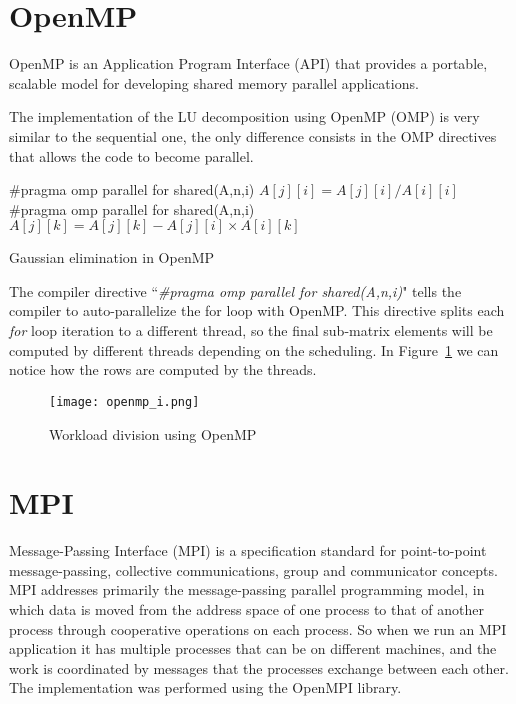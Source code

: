 \section{OpenMP}
OpenMP is an Application Program Interface (API) that provides a portable, scalable model for developing shared memory parallel applications.

The implementation of the LU decomposition using OpenMP (OMP) is very similar to the sequential one, the only difference consists in the OMP directives that allows the code to become parallel.

\begin{algorithm}
\begin{algorithmic}
	\State \#pragma omp parallel for shared(A,n,i)
		\State $A[j][i] = A[j][i] / A[i][i]$ 
	\EndFor
	\State \#pragma omp parallel for shared(A,n,i)
			\State $A[j][k] = A[j][k] - A[j][i] \times A[i][k]$ 
		\EndFor	
	\EndFor
\EndFor
\end{algorithmic}
\caption{Gaussian elimination in OpenMP}
\label{alg:omp_code}
\end{algorithm}

The compiler directive ``\textit{\#pragma omp parallel for shared(A,n,i)}" tells the compiler to auto-parallelize the for loop with OpenMP. This directive splits each \textit{for} loop iteration to a different thread, so the final sub-matrix elements will be computed by different threads depending on the scheduling. In Figure~\ref{img:omp_workload}  we can notice how the rows are computed by the threads.


\begin{figure}[H]
\centering
\texttt{[image: openmp\_i.png]}
\caption{Workload division using OpenMP}
\label{img:omp_workload}
\end{figure}



\section{MPI}

Message-Passing Interface (MPI) is a specification standard for point-to-point message-passing, collective communications, group and communicator concepts. MPI addresses primarily the message-passing parallel programming model, in which data is moved from the address space of one process to that of another process through cooperative operations on each process. So when we run an MPI application it has multiple processes that can be on different machines, and the work is coordinated by messages that the processes exchange between each other. The implementation was performed using the OpenMPI library.

